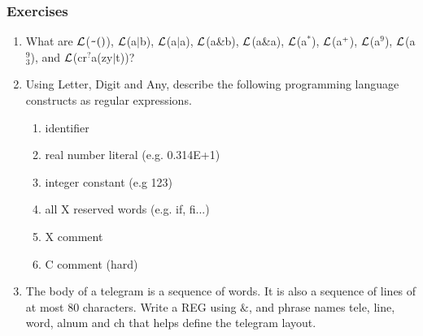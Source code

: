 \subsubsection{Exercises}
\begin{enumerate}\setcounter{enumi}{\value{RunningExercise}}
\item What are
${\cal L}$($\tw()$),
${\cal L}$(a$|$b),
${\cal L}$(a$|$a),
${\cal L}$(a\&b),
${\cal L}$(a\&a),
${\cal L}$(a$^*$),
${\cal L}$(a$^{\scriptscriptstyle +}$),
${\cal L}$(a$^9$),
${\cal L}$(a$^9_3$), and
${\cal L}$(cr$^?$a(zy$|$t))?

\item Using Letter, Digit and Any, describe the following  
programming language constructs as regular expressions.
\begin{enumerate}
\item identifier
\item real number literal (e.g. 0.314E+1)
\item integer constant (e.g 123)
\item all X reserved words  (e.g. if, fi...)
\item X comment
\item C comment (hard)
\end{enumerate}

\item The body of a telegram is a sequence of words.  
It is also a sequence of lines of at most 80 characters.  
Write a REG using $\&$, and phrase names tele, line, word, alnum and ch
that helps define the telegram layout.

\setcounter{RunningExercise}{\value{enumi}}

\end{enumerate}



